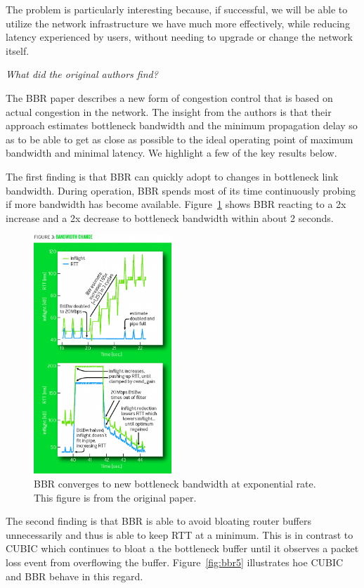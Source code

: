 The problem is particularly interesting because, if successful, we will be able
to utilize the network infrastructure we have much more effectively, while
reducing latency experienced by users, without needing to upgrade or change
the network itself.

\emph{What did the original authors find?}

The BBR paper describes a new form of congestion control that is based on actual
congestion in the network. The insight from the authors is that their
approach estimates bottleneck bandwidth and the minimum propagation delay
so as to be able to get as close as possible to the ideal operating point of
maximum bandwidth and minimal latency. We highlight a few of the key
results below.

The first finding is that BBR can quickly adopt to changes in bottleneck link
bandwidth. During operation, BBR spends most of its time continuously probing
if more bandwidth has become available. Figure~\ref{fig:bbr3} shows BBR
reacting to a 2x increase and a 2x decrease to bottleneck bandwidth within
about 2 seconds.

\begin{figure}[h]
  \centering
  \includegraphics[height=9cm]{./img/bbr_fig3.png}
  \caption{BBR converges to new bottleneck bandwidth at exponential rate.
  This figure is from the original paper.}
  \label{fig:bbr3}
\end{figure}

The second finding is that BBR is able to avoid bloating router buffers
unnecessarily and thus is able to keep RTT at a minimum. This is in contrast to
CUBIC which continues to bloat a the bottleneck buffer until it observes a
packet loss event from overflowing the buffer. Figure~\ref{fig:bbr5} illustrates
hoe CUBIC and BBR behave in this regard.

